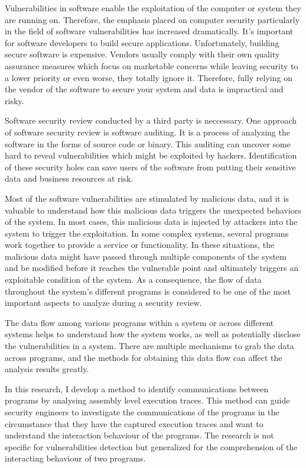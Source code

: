 \label{chapter:introduction}
Vulnerabilities in software enable the exploitation of the computer or system they are running on. Therefore, the emphasis placed on computer security particularly in the field of software vulnerabilities has increased dramatically. It's important for software developers to build secure applications. Unfortunately, building secure software is expensive. Vendors usually comply with their own quality assurance measures which focus on marketable concerns while leaving security to a lower priority or even worse, they totally ignore it. Therefore, fully relying on the vendor of the software to secure your system and data is impractical and risky. \cite{dowd_art_2006}

Software security review conducted by a third party is neccessary. One approach of software security review is software auditing. It is a process of analyzing the software in the forms of source code or binary. This auditing can uncover some hard to reveal vulnerabilities which might be exploited by hackers. Identification of these security holes can save users of the software from putting their sensitive data and business resources at risk. \cite{dowd_art_2006}

Most of the software vulnerabilities are stimulated by malicious data, and it is valuable to understand how this malicious data triggers the unexpected behaviors of the system. In most cases, this malicious data is injected by attackers into the system to trigger the exploitation. In some complex systems, several programs work together to provide a service or functionality. In these situations, the malicious data might have passed through multiple components of the system and be modified before it reaches the vulnerable point and ultimately triggers an exploitable condition of the system. As a consequence, the flow of data throughout the system's different programs is considered to be one of the most important aspects to analyze during a security review. \cite{dowd_art_2006}

The data flow among various programs within a system or across different systems helps to understand how the system works, as well as potentially disclose the vulnerabilities in a system. There are multiple mechanisms to grab the data across programs, and the methods for obtaining this data flow can affect the analysis results greatly. 

In this research, I develop a method to identify communications between programs by analysing assembly level execution traces. This method can guide security engineers to investigate the communications of the programs in the circumstance that they have the captured execution traces and want to understand the interaction behaviour of the programs. The research is not specific for vulnerabilities detection but generalized for the comprehension of the interacting behaviour of two programs.

